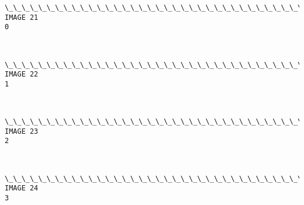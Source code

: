 \documentclass[11pt]{article}
\begin{document}
    \begin{Verbatim}[commandchars=\\\{\}]
\_\_\_\_\_\_\_\_\_\_\_\_\_\_\_\_\_\_\_\_\_\_\_\_\_\_\_\_\_\_\_\_\_\_\_\_\_\_\_\_\_\_\_\_\_\_\_\_\_\_\_\_\_\_\_\_\_\_\_\_
IMAGE 21
0

    \end{Verbatim}

    \begin{center}
    \end{center}
    { \hspace*{\fill} \\}
    
    \begin{Verbatim}[commandchars=\\\{\}]
\_\_\_\_\_\_\_\_\_\_\_\_\_\_\_\_\_\_\_\_\_\_\_\_\_\_\_\_\_\_\_\_\_\_\_\_\_\_\_\_\_\_\_\_\_\_\_\_\_\_\_\_\_\_\_\_\_\_\_\_
IMAGE 22
1

    \end{Verbatim}

    \begin{center}
    \end{center}
    { \hspace*{\fill} \\}
    
    \begin{Verbatim}[commandchars=\\\{\}]
\_\_\_\_\_\_\_\_\_\_\_\_\_\_\_\_\_\_\_\_\_\_\_\_\_\_\_\_\_\_\_\_\_\_\_\_\_\_\_\_\_\_\_\_\_\_\_\_\_\_\_\_\_\_\_\_\_\_\_\_
IMAGE 23
2

    \end{Verbatim}

    \begin{center}
    \end{center}
    { \hspace*{\fill} \\}
    
    \begin{Verbatim}[commandchars=\\\{\}]
\_\_\_\_\_\_\_\_\_\_\_\_\_\_\_\_\_\_\_\_\_\_\_\_\_\_\_\_\_\_\_\_\_\_\_\_\_\_\_\_\_\_\_\_\_\_\_\_\_\_\_\_\_\_\_\_\_\_\_\_
IMAGE 24
3

    \end{Verbatim}
\end{document}
